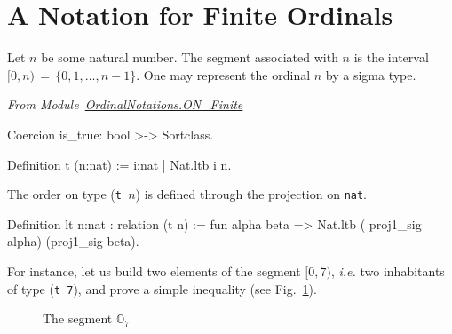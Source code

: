 
  


\section{A Notation for Finite Ordinals}


Let $n$ be some natural number. The segment associated with $n$ is the interval 
$[0,n)\,=\,\{0,1,\dots,n-1\}$. 
One may represent the ordinal $n$ by a sigma type.


\vspace{4pt}
\noindent\emph{From Module~\href{../theories/html/hydras.OrdinalNotations.ON_Finite.html}{OrdinalNotations.ON\_Finite}}

\label{def: Finite-ord-type}
\begin{Coqsrc}
Coercion is_true: bool >-> Sortclass.

Definition t (n:nat) := {i:nat | Nat.ltb i n}.
\end{Coqsrc}

The order on type (\texttt{t $n$}) is defined through the projection on \texttt{nat}.


\begin{Coqsrc}
Definition lt {n:nat} : relation (t n) :=
  fun alpha beta => Nat.ltb ( proj1_sig alpha) (proj1_sig beta).
\end{Coqsrc}

For instance, let us build two elements of the segment $[0, 7)$, \emph{i.e.} two
inhabitants of   type (\texttt{t 7}), and prove a simple  inequality (see Fig.~\ref{fig:O7}).

\begin{figure}[h]
\centering
{}

\caption{The segment $\mathbb{O}_7$\label{fig:O7}}
\end{figure}
  
